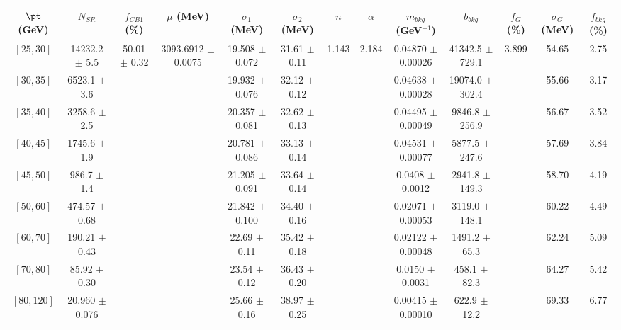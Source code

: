 \begin{tabular}{c||c|c|c|c|c|c|c|c|c|c|c||c}
$\pt$ (GeV) & $N_{SR}$ & $f_{CB1}$ (\%) & $\mu$ (MeV) & $\sigma_1$ (MeV) & $\sigma_2$ (MeV) & $n$ & $\alpha$ & $m_{bkg}$ (GeV$^{-1}$) & $b_{bkg}$ & $f_G$ (\%) & $\sigma_G$ (MeV) & $f_{bkg}$ (\%) \\
\hline
$[25, 30]$ & 14232.2 $\pm$ 5.5 & \multirow{9}{*}{50.01 $\pm$ 0.32} & \multirow{9}{*}{3093.6912 $\pm$ 0.0075} & 19.508 $\pm$ 0.072 & 31.61 $\pm$ 0.11 & \multirow{9}{*}{1.143} & \multirow{9}{*}{2.184} & 0.04870 $\pm$ 0.00026 & 41342.5 $\pm$ 729.1 & \multirow{9}{*}{3.899} & 54.65 & 2.75\\
$[30, 35]$ & 6523.1 $\pm$ 3.6 &  &  & 19.932 $\pm$ 0.076 & 32.12 $\pm$ 0.12 &  &  & 0.04638 $\pm$ 0.00028 & 19074.0 $\pm$ 302.4 &  & 55.66 & 3.17\\
$[35, 40]$ & 3258.6 $\pm$ 2.5 &  &  & 20.357 $\pm$ 0.081 & 32.62 $\pm$ 0.13 &  &  & 0.04495 $\pm$ 0.00049 & 9846.8 $\pm$ 256.9 &  & 56.67 & 3.52\\
$[40, 45]$ & 1745.6 $\pm$ 1.9 &  &  & 20.781 $\pm$ 0.086 & 33.13 $\pm$ 0.14 &  &  & 0.04531 $\pm$ 0.00077 & 5877.5 $\pm$ 247.6 &  & 57.69 & 3.84\\
$[45, 50]$ & 986.7 $\pm$ 1.4 &  &  & 21.205 $\pm$ 0.091 & 33.64 $\pm$ 0.14 &  &  & 0.0408 $\pm$ 0.0012 & 2941.8 $\pm$ 149.3 &  & 58.70 & 4.19\\
$[50, 60]$ & 474.57 $\pm$ 0.68 &  &  & 21.842 $\pm$ 0.100 & 34.40 $\pm$ 0.16 &  &  & 0.02071 $\pm$ 0.00053 & 3119.0 $\pm$ 148.1 &  & 60.22 & 4.49\\
$[60, 70]$ & 190.21 $\pm$ 0.43 &  &  & 22.69 $\pm$ 0.11 & 35.42 $\pm$ 0.18 &  &  & 0.02122 $\pm$ 0.00048 & 1491.2 $\pm$ 65.3 &  & 62.24 & 5.09\\
$[70, 80]$ & 85.92 $\pm$ 0.30 &  &  & 23.54 $\pm$ 0.12 & 36.43 $\pm$ 0.20 &  &  & 0.0150 $\pm$ 0.0031 & 458.1 $\pm$ 82.3 &  & 64.27 & 5.42\\
$[80, 120]$ & 20.960 $\pm$ 0.076 &  &  & 25.66 $\pm$ 0.16 & 38.97 $\pm$ 0.25 &  &  & 0.00415 $\pm$ 0.00010 & 622.9 $\pm$ 12.2 &  & 69.33 & 6.77\\
\end{tabular}
